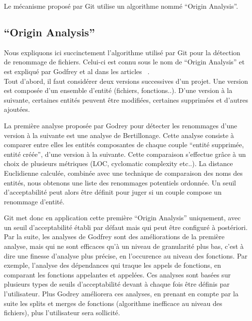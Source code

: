 Le mécanisme proposé par Git utilise un algorithme nommé ``Origin Analysis''.

\subsection{``Origin Analysis''}

Nous expliquons ici succinctement l'algorithme utilisé par Git pour la détection de renommage de fichiers. Celui-ci est connu sous le nom de ``Origin Analysis'' et est expliqué par Godfrey et al dans les articles ~\cite{tu_integrated_2002,godfrey_tracking_2002,godfrey_using_2005}.\\

Tout d'abord, il faut considérer deux versions successives d'un projet. Une version est composée d'un ensemble d'entité (fichiers, fonctions..). D'une version à la suivante, certaines entités peuvent être modifiées, certaines supprimées et d'autres ajoutées.

La première analyse proposée par Godrey pour détecter les renommages d'une version à la suivante est une analyse de Bertillonage. Cette analyse consiste à comparer entre elles les entités composantes de chaque couple ``entité supprimée, entité créée'', d'une version à la suivante. Cette comparaison s'effectue grâce à un choix de plusieurs métriques (LOC, cyclomatic complexity etc..). La distance Euclidienne calculée, combinée avec une technique de comparaison des noms des entités, nous obtenons une liste des renommages potentiels ordonnée. Un seuil d'acceptabilité peut alors être définit pour juger si un couple compose un renommage d'entité.

Git met donc en application cette première ``Origin Analysis'' uniquement, avec un seuil d'acceptabilité établi par défaut mais qui peut être configuré à postériori.\\

Par la suite, les analyses de Godfrey sont des améliorations de la première analyse, mais qui ne sont efficaces qu'à un niveau de granularité plus bas, c'est à dire une finesse d'analyse plus précise, en l'occurence au niveau des fonctions. Par exemple, l'analyse des dépendances qui traque les appels de fonctions, en comparant les fonctions appelantes et appelées. Ces analyses sont basées sur plusieurs types de seuils d'acceptabilité devant à chaque fois être définis par l'utilisateur. Plus Godrey améliorera ces analyses, en prenant en compte par la suite les splits et merges de fonctions (algorithme inefficace au niveau des fichiers), plus l'utilisateur sera sollicité.\\


